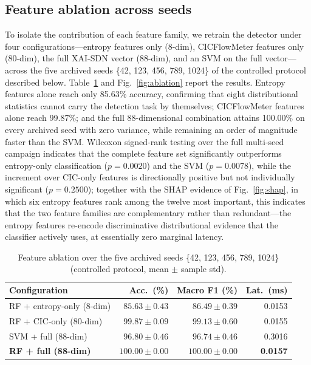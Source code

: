 ﻿\documentclass[journal]{IEEEtran}
\begin{document}
\subsection{Feature ablation across seeds}
To isolate the contribution of each feature family, we retrain the detector under four configurations---entropy features only (8-dim), CICFlowMeter features only (80-dim), the full XAI-SDN vector (88-dim), and an SVM on the full vector---across the five archived seeds \{42, 123, 456, 789, 1024\} of the controlled protocol described below. Table~\ref{tab:ablation} and Fig.~\ref{fig:ablation} report the results. Entropy features alone reach only 85.63\% accuracy, confirming that eight distributional statistics cannot carry the detection task by themselves; CICFlowMeter features alone reach 99.87\%; and the full 88-dimensional combination attains 100.00\% on every archived seed with zero variance, while remaining an order of magnitude faster than the SVM. Wilcoxon signed-rank testing over the full multi-seed campaign indicates that the complete feature set significantly outperforms entropy-only classification ($p=0.0020$) and the SVM ($p=0.0078$), while the increment over CIC-only features is directionally positive but not individually significant ($p=0.2500$); together with the SHAP evidence of Fig.~\ref{fig:shap}, in which six entropy features rank among the twelve most important, this indicates that the two feature families are complementary rather than redundant---the entropy features re-encode discriminative distributional evidence that the classifier actively uses, at essentially zero marginal latency.

\begin{table}[!t]
\centering
\caption{Feature ablation over the five archived seeds \{42, 123, 456, 789, 1024\} (controlled protocol, mean $\pm$ sample std).}
\label{tab:ablation}
\small
\setlength{\tabcolsep}{3.5pt}
\begin{tabular}{@{}lrrr@{}}
\toprule
\textbf{Configuration} & \textbf{Acc.\ (\%)} & \textbf{Macro F1 (\%)} & \textbf{Lat.\ (ms)} \\
\midrule
RF + entropy-only (8-dim) & $85.63 \pm 0.43$ & $86.49 \pm 0.39$ & 0.0153 \\
RF + CIC-only (80-dim) & $99.87 \pm 0.09$ & $99.13 \pm 0.60$ & 0.0155 \\
SVM + full (88-dim) & $96.80 \pm 0.46$ & $96.74 \pm 0.46$ & 0.3016 \\
\textbf{RF + full (88-dim)} & $\mathbf{100.00 \pm 0.00}$ & $\mathbf{100.00 \pm 0.00}$ & \textbf{0.0157} \\
\bottomrule
\end{tabular}
\end{table}
\end{document}
